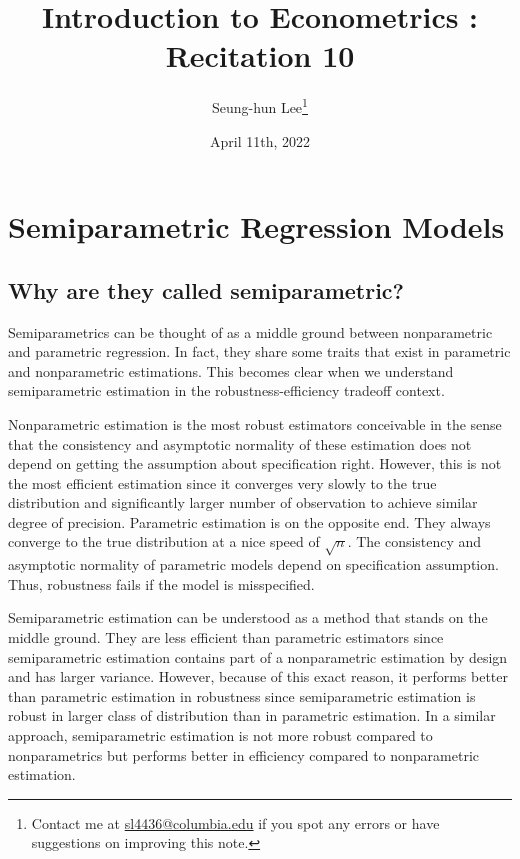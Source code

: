 \documentclass[12pt]{article}
\title{Introduction to Econometrics \ROM{2}: Recitation 10}
\theoremstyle{definition}
\theoremstyle{property}
\theoremstyle{assumption}
\theoremstyle{example}
\theoremstyle{comment}
\begin{document}
\linespread{1.25}
\onehalfspacing

\author{Seung-hun Lee\footnote{Contact me at \href{mailto:sl4436@columbia.edu}{sl4436@columbia.edu} if you spot any errors or have suggestions on improving this note.}}
\date{April 11th, 2022}
\maketitle
\thispagestyle{firstpage}




\section{Semiparametric Regression Models}
\subsection{Why are they called semiparametric?}
Semiparametrics can be thought of as a middle ground between nonparametric and parametric regression. In fact, they share some traits that exist in parametric and nonparametric estimations. This becomes clear when we understand semiparametric estimation in the robustness-efficiency tradeoff context.  \par
Nonparametric estimation is the most robust estimators conceivable in the sense that the consistency and asymptotic normality of these estimation does not depend on getting the assumption about specification right. However, this is not the most efficient estimation since it converges very slowly to the true distribution and significantly larger number of observation to achieve similar degree of precision. Parametric estimation is on the opposite end. They always converge to the true distribution at a nice speed of $\sqrt{n}$. The consistency and asymptotic normality of parametric models depend on specification assumption. Thus, robustness fails if the model is misspecified.
\par
Semiparametric estimation can be understood as a method that stands on the middle ground. They are less efficient than parametric estimators since semiparametric estimation contains part of a nonparametric estimation by design and has larger variance. However, because of this exact reason, it performs better than parametric estimation in robustness since semiparametric estimation is robust in larger class of distribution than in parametric estimation. In a similar approach, semiparametric estimation is not more robust compared to nonparametrics but performs better in efficiency compared to nonparametric estimation. 
\end{document}
